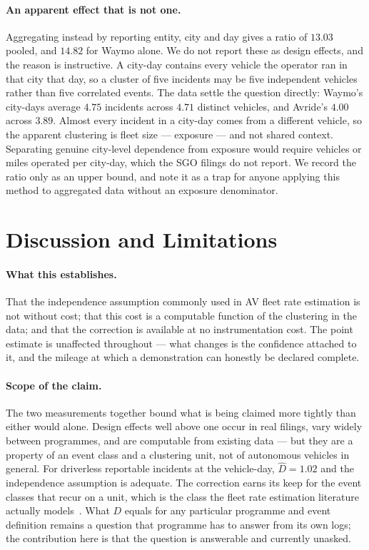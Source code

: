 \documentclass[11pt]{article}
\begin{document}
\paragraph{An apparent effect that is not one.} Aggregating instead by reporting
entity, city and day gives a ratio of $13.03$ pooled, and $14.82$ for Waymo
alone. We do not report these as design effects, and the reason is instructive.
A city-day contains every vehicle the operator ran in that city that day, so a
cluster of five incidents may be five independent vehicles rather than five
correlated events. The data settle the question directly: Waymo's city-days
average $4.75$ incidents across $4.71$ distinct vehicles, and Avride's $4.00$
across $3.89$. Almost every incident in a city-day comes from a different
vehicle, so the apparent clustering is fleet size --- exposure --- and not shared
context. Separating genuine city-level dependence from exposure would require
vehicles or miles operated per city-day, which the SGO filings do not report. We
record the ratio only as an upper bound, and note it as a trap for anyone
applying this method to aggregated data without an exposure denominator.

\section{Discussion and Limitations}

\paragraph{What this establishes.} That the independence assumption commonly used
in AV fleet rate estimation is not without cost; that this cost is a computable
function of the clustering in the data; and that the correction is available at no
instrumentation cost. The point estimate is unaffected throughout --- what changes
is the confidence attached to it, and the mileage at which a demonstration can
honestly be declared complete.

\paragraph{Scope of the claim.} The two measurements together bound what is being
claimed more tightly than either would alone. Design effects well above one occur
in real filings, vary widely between programmes, and are computable from existing
data --- but they are a property of an event class and a clustering unit, not of
autonomous vehicles in general. For driverless reportable incidents at the
vehicle-day, $\hat{D} = 1.02$ and the independence assumption is adequate. The
correction earns its keep for the event classes that recur on a unit, which is
the class the fleet rate estimation literature actually
models~\cite{terres2023behavioral,chen2026confidence}. What $D$ equals for any
particular programme and event definition remains a question that programme has
to answer from its own logs; the contribution here is that the question is
answerable and currently unasked.
\end{document}
